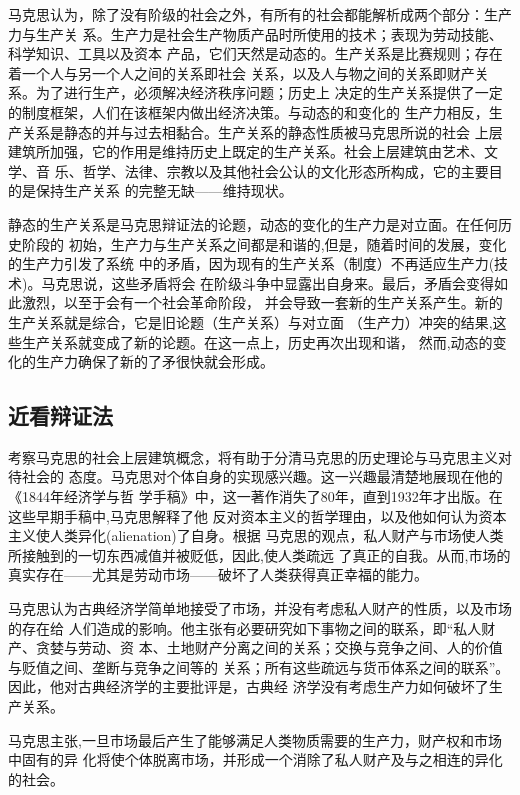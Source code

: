 马克思认为，除了没有阶级的社会之外，有所有的社会都能解析成两个部分：生产力与生产关
系。生产力是社会生产物质产品时所使用的技术；表现为劳动技能、科学知识、工具以及资本
产品，它们天然是动态的。生产关系是比赛规则；存在着一个人与另一个人之间的关系即社会
关系，以及人与物之间的关系即财产关系。为了进行生产，必须解决经济秩序问题；历史上
决定的生产关系提供了一定的制度框架，人们在该框架内做出经济决策。与动态的和变化的
生产力相反，生产关系是静态的并与过去相黏合。生产关系的静态性质被马克思所说的社会
上层建筑所加强，它的作用是维持历史上既定的生产关系。社会上层建筑由艺术、文学、音
乐、哲学、法律、宗教以及其他社会公认的文化形态所构成，它的主要目的是保持生产关系
的完整无缺——维持现状。

静态的生产关系是马克思辩证法的论题，动态的变化的生产力是对立面。在任何历史阶段的
初始，生产力与生产关系之间都是和谐的,但是，随着时间的发展，变化的生产力引发了系统
中的矛盾，因为现有的生产关系（制度）不再适应生产力(技术)。马克思说，这些矛盾将会
在阶级斗争中显露出自身来。最后，矛盾会变得如此激烈，以至于会有一个社会革命阶段，
并会导致一套新的生产关系产生。新的生产关系就是综合，它是旧论题（生产关系）与对立面
（生产力）冲突的结果,这些生产关系就变成了新的论题。在这一点上，历史再次出现和谐，
然而,动态的变化的生产力确保了新的了矛很快就会形成。

\subsection{近看辩证法}

考察马克思的社会上层建筑概念，将有助于分清马克思的历史理论与马克思主义对待社会的
态度。马克思对个体自身的实现感兴趣。这一兴趣最清楚地展现在他的《1844年经济学与哲
学手稿》中，这一著作消失了80年，直到1932年才出版。在这些早期手稿中,马克思解释了他
反对资本主义的哲学理由，以及他如何认为资本主义使人类异化(alienation)了自身。根据
马克思的观点，私人财产与市场使人类所接触到的一切东西减值并被贬低，因此,使人类疏远
了真正的自我。从而,市场的真实存在——尤其是劳动市场——破坏了人类获得真正幸福的能力。

马克思认为古典经济学简单地接受了市场，并没有考虑私人财产的性质，以及市场的存在给
人们造成的影响。他主张有必要研究如下事物之间的联系，即“私人财产、贪婪与劳动、资
本、土地财产分离之间的关系；交换与竞争之间、人的价值与贬值之间、垄断与竞争之间等的
关系；所有这些疏远与货币体系之间的联系”。因此，他对古典经济学的主要批评是，古典经
济学没有考虑生产力如何破坏了生产关系。

马克思主张,一旦市场最后产生了能够满足人类物质需要的生产力，财产权和市场中固有的异
化将使个体脱离市场，并形成一个消除了私人财产及与之相连的异化的社会。

